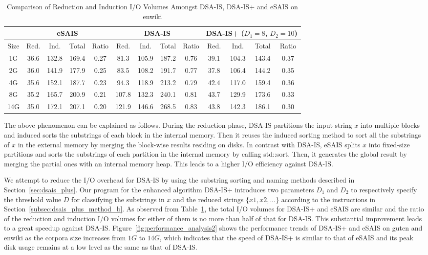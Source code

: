 \documentclass[10pt,journal,compsoc]{IEEEtran}
\begin{document}
\begin{table}%
\caption{Comparison of Reduction and Induction I/O Volumes Amongst DSA-IS, DSA-IS+ and eSAIS on enwiki}
\label{tbl:volume_cmp}
\centering
\begin{tabular}{|c|c|c|c|c|c|c|c|c|c|c|c|c|}
	\hline
	\multicolumn{1}{|c}{} & \multicolumn{4}{|c|}{eSAIS} & \multicolumn{4}{c|}{DSA-IS} & \multicolumn{4}{c|}{DSA-IS+ ($D_1 = 8$, $D_2 = 10$)}\\\hline
	\hline
	Size & Red. & Ind. & Total & Ratio & Red. & Ind. & Total & Ratio & Red. & Ind. & Total & Ratio\\\hline
	1G & 36.6 & 132.8 & 169.4 & 0.27 & 81.3 & 105.9 & 187.2 & 0.76 & 39.1 & 104.3 & 143.4 & 0.37\\\hline
	2G & 36.0 & 141.9 & 177.9 & 0.25 & 83.5 & 108.2 & 191.7 & 0.77 & 37.8 & 106.4 & 144.2 & 0.35\\\hline
	4G & 35.6 & 152.1 & 187.7 & 0.23 & 94.3 & 118.9 & 213.2 & 0.79 & 42.4 & 117.0 & 159.4 & 0.36\\\hline
	8G & 35.2 & 165.7 & 200.9 & 0.21 & 107.8 & 132.3 & 240.1 & 0.81 & 43.7 & 129.9 & 173.6 & 0.33\\\hline
	14G & 35.0 & 172.1 & 207.1 & 0.20 & 121.9 & 146.6 & 268.5 & 0.83 & 43.8 & 142.3 & 186.1 & 0.30\\\hline
\end{tabular}
\end{table}%

The above phenomenon can be explained as follows. During the reduction phase, DSA-IS partitions the input string $x$ into multiple blocks and induced sorts the substrings of each block in the internal memory. Then it reuses the induced sorting method to sort all the substrings of $x$ in the external memory by merging the block-wise results residing on disks. In contrast with DSA-IS, eSAIS splits $x$ into fixed-size partitions and sorts the substrings of each partition in the internal memory by calling std::sort. Then, it generates the global result by merging the partial ones with an internal memory heap. This leads to a higher I/O efficiency against DSA-IS.

We attempt to reduce the I/O overhead for DSA-IS by using the substring sorting and naming methods described in Section~\ref{sec:dsais_plus}. Our program for the enhanced algorithm DSA-IS+ introduces two parameters $D_1$ and $D_2$ to respectively specify the threshold value $D$ for classifying the substrings in $x$ and the reduced strings $\{x1, x2, ...\}$ according to the instructions in Section~\ref{subsec:dsais_plus_method_b}. As observed from Table~\ref{tbl:volume_cmp}, the total I/O volumes for DSA-IS+ and eSAIS are similar and the ratio of the reduction and induction I/O volumes for either of them is no more than half of that for DSA-IS. This substantial improvement leads to a great speedup against DSA-IS. Figure~\ref{fig:performance_analysis2} shows the performance trends of DSA-IS+ and eSAIS on guten and enwiki as the corpora size increases from $1G$ to $14G$, which indicates that the speed of DSA-IS+ is similar to that of eSAIS and its peak disk usage remains at a low level as the same as that of DSA-IS.
\end{document}
